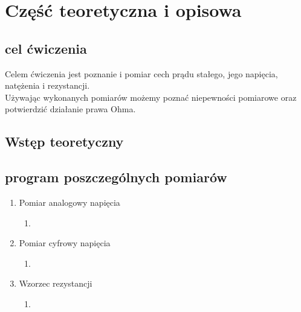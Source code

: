 \documentclass{article}  %
\begin{document}
    \section{Część teoretyczna i opisowa}
        \subsection{cel ćwiczenia}
            \begin{flushleft}
                Celem ćwiczenia jest poznanie i pomiar cech prądu stałego, jego napięcia, natężenia i rezystancji.\\
                Używając wykonanych pomiarów możemy poznać niepewności pomiarowe oraz potwierdzić działanie prawa Ohma.
            \end{flushleft}
        \subsection{Wstęp teoretyczny}

        \subsection{program poszczególnych pomiarów}
            \begin{enumerate}
                \item Pomiar analogowy napięcia
                \begin{enumerate}
                    \item
                \end{enumerate}
                \item Pomiar cyfrowy napięcia
                    \begin{enumerate}
                        \item
                    \end{enumerate}
                \item Wzorzec rezystancji
                    \begin{enumerate}
                        \item
                    \end{enumerate}
            \end{enumerate}
\end{document}
